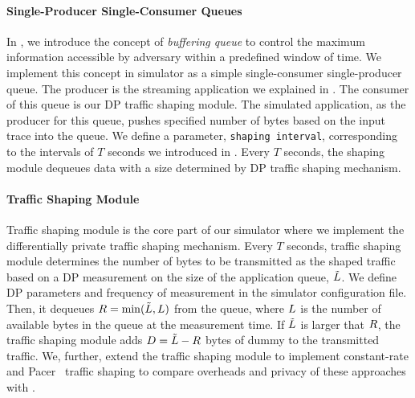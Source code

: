 \paragraph{Single-Producer Single-Consumer Queues}\label{subsubsec:design-sim-spsc-queue}
In , we introduce the concept of \textit{buffering queue} to control the maximum information accessible by adversary within a predefined window of time.
We implement this concept in simulator as a simple single-consumer single-producer queue.
The producer is the streaming application we explained in .
The consumer of this queue is our DP traffic shaping module.
The simulated application, as the producer for this queue, pushes specified number of bytes based on the input trace into the queue.
We define a parameter, \texttt{shaping interval}, corresponding to the intervals of $T$ seconds we introduced in .
Every $T$ seconds, the shaping module dequeues data with a size determined by
DP traffic shaping mechanism.



\paragraph{Traffic Shaping Module}
Traffic shaping module is the core part of our simulator where we implement the differentially private traffic shaping mechanism.
Every $T$ seconds, traffic shaping module determines the number of bytes to be transmitted as the shaped traffic based on a DP measurement on the size of the application queue, $\tilde{L}$.
We define DP parameters and frequency of measurement in the simulator configuration file. 
Then, it dequeues $R = \min(\tilde{L}, L)$ from the queue, where $L$ is the number of available bytes in the queue at the measurement time. 
If $\tilde{L}$ is larger that $R$, the traffic shaping module adds $D = \tilde{L} - R$ bytes of dummy to the transmitted traffic.
We, further, extend the traffic shaping module to implement constant-rate and Pacer~\cite{mehta2022pacer} traffic shaping to compare overheads and privacy of these approaches with {\sys}. 

